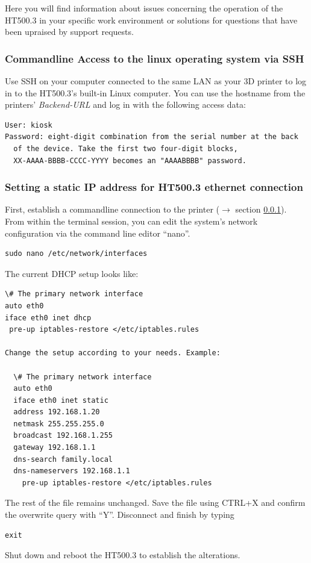 Here you will find information about issues concerning the operation of the HT500.3 in your specific work environment or solutions for questions that have been upraised by support requests. 


\subsubsection{Commandline Access to the linux operating system via SSH} \label{sec:commandlineaccess}

Use SSH on your computer connected to the same LAN as your 3D printer to log in to the HT500.3's built-in Linux computer. You can use the hostname from the printers' 
\emph{Backend-URL} and log in with the following access data: 

\begin{verbatim}
User: kiosk
Password: eight-digit combination from the serial number at the back
  of the device. Take the first two four-digit blocks,
  XX-AAAA-BBBB-CCCC-YYYY becomes an "AAAABBBB" password.
\end{verbatim}


\subsubsection{Setting a static IP address for HT500.3 ethernet connection}

First, establish a commandline connection to the printer ($\rightarrow$ section \ref{sec:commandlineaccess}). 
From within the terminal session, you can edit the system's network configuration via the command line editor “nano”.

\begin{verbatim}
sudo nano /etc/network/interfaces
\end{verbatim}
The current DHCP setup looks like:
\begin{verbatim}
\# The primary network interface
auto eth0
iface eth0 inet dhcp
 pre-up iptables-restore </etc/iptables.rules

Change the setup according to your needs. Example:

  \# The primary network interface
  auto eth0
  iface eth0 inet static
  address 192.168.1.20
  netmask 255.255.255.0
  broadcast 192.168.1.255
  gateway 192.168.1.1
  dns-search family.local
  dns-nameservers 192.168.1.1
    pre-up iptables-restore </etc/iptables.rules
\end{verbatim}
The rest of the file remains unchanged. Save the file using CTRL+X and confirm the overwrite query with “Y”. Disconnect and finish by typing
\begin{verbatim}
exit
\end{verbatim}
Shut down and reboot the HT500.3 to establish the alterations.

